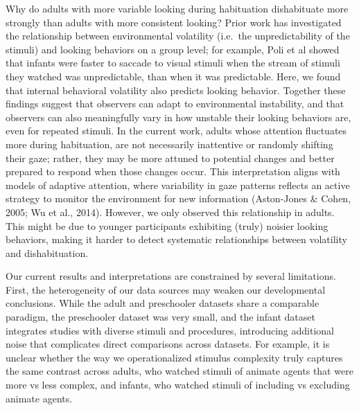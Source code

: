 \documentclass[10pt, letterpaper]{article}
\begin{document}
Why do adults with more variable looking during habituation dishabituate
more strongly than adults with more consistent looking? Prior work has
investigated the relationship between environmental volatility (i.e.~the
unpredictability of the stimuli) and looking behaviors on a group level;
for example, Poli et al showed that infants were faster to saccade to
visual stimuli when the stream of stimuli they watched was
unpredictable, than when it was predictable. Here, we found that
internal behavioral volatility also predicts looking behavior. Together
these findings suggest that observers can adapt to environmental
instability, and that observers can also meaningfully vary in how
unstable their looking behaviors are, even for repeated stimuli. In the
current work, adults whose attention fluctuates more during habituation,
are not necessarily inattentive or randomly shifting their gaze; rather,
they may be more attuned to potential changes and better prepared to
respond when those changes occur. This interpretation aligns with models
of adaptive attention, where variability in gaze patterns reflects an
active strategy to monitor the environment for new information
(Aston-Jones \& Cohen, 2005; Wu et al., 2014). However, we only observed
this relationship in adults. This might be due to younger participants
exhibiting (truly) noisier looking behaviors, making it harder to detect
systematic relationships between volatility and dishabituation.

Our current results and interpretations are constrained by several
limitations. First, the heterogeneity of our data sources may weaken our
developmental conclusions. While the adult and preschooler datasets
share a comparable paradigm, the preschooler dataset was very small, and
the infant dataset integrates studies with diverse stimuli and
procedures, introducing additional noise that complicates direct
comparisons across datasets. For example, it is unclear whether the way
we operationalized stimulus complexity truly captures the same contrast
across adults, who watched stimuli of animate agents that were more vs
less complex, and infants, who watched stimuli of including vs excluding
animate agents.
\end{document}
